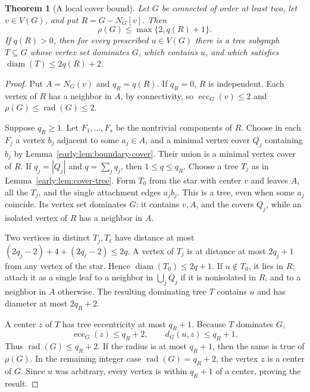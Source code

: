\documentclass[11pt,a4paper]{article}
\newtheorem{theorem}{Theorem}[section]
\theoremstyle{definition}\newtheorem{definition}[theorem]{Definition}
\theoremstyle{remark}\newtheorem{remark}[theorem]{Remark}
\newcommand{\rad}{\operatorname{rad}}
\newcommand{\diam}{\operatorname{diam}}
\begin{document}
\begin{theorem}[A local cover bound]
\label{early:thm:center-local}
Let $G$ be connected of order at least two, let $v\in V(G)$, and put
$R=G-N_G[v]$.  Then
\begin{equation}
 \rho(G)\leq\max\{2,q(R)+1\}.
 \label{early:eq:center-local}
\end{equation}
If $q(R)>0$, then for every prescribed $u\in V(G)$ there is a tree
subgraph $T\subseteq G$ whose vertex set dominates $G$, which contains
$u$, and which satisfies $\diam(T)\leq2q(R)+2$.
\end{theorem}
\begin{proof}
Put $A=N_G(v)$ and $q_R=q(R)$.  If $q_R=0$, $R$ is independent.  Each
vertex of $R$ has a neighbor in $A$, by connectivity, so
$\operatorname{ecc}_G(v)\leq2$ and $\rho(G)\leq\rad(G)\leq2$.

Suppose $q_R\geq1$.  Let $F_1,\ldots,F_s$ be the nontrivial components
of $R$.  Choose in each $F_j$ a vertex $b_j$ adjacent to some $a_j\in A$,
and a minimal vertex cover $Q_j$ containing $b_j$ by
Lemma~\ref{early:lem:boundary-cover}.  Their union is a minimal vertex
cover of $R$.  If $q_j=|Q_j|$ and $q=\sum_jq_j$, then $1\leq q\leq q_R$.
Choose a tree $T_j$ as in Lemma~\ref{early:lem:cover-tree}.  Form $T_0$
from the star with center $v$ and leaves $A$, all the $T_j$, and the
single attachment edges $a_jb_j$.  This is a tree, even when some $a_j$
coincide.  Its vertex set dominates $G$: it contains $v,A$, and the covers
$Q_j$, while an isolated vertex of $R$ has a neighbor in $A$.

Two vertices in distinct $T_j,T_\ell$ have distance at most
$(2q_j-2)+4+(2q_\ell-2)\leq2q$.  A vertex of $T_j$ is at distance at
most $2q_j+1$ from any vertex of the star.  Hence
$\diam(T_0)\leq2q+1$.  If $u\notin T_0$, it lies in $R$; attach it as
a single leaf to a neighbor in $\bigcup_jQ_j$ if it is nonisolated in
$R$, and to a neighbor in $A$ otherwise.  The resulting dominating tree
$T$ contains $u$ and has diameter at most $2q_R+2$.

A center $z$ of $T$ has tree eccentricity at most $q_R+1$.  Because $T$
dominates $G$,
\[
 \operatorname{ecc}_G(z)\leq q_R+2,
 \qquad d_G(u,z)\leq q_R+1.
\]
Thus $\rad(G)\leq q_R+2$.  If the radius is at most $q_R+1$, then the
same is true of $\rho(G)$.  In the remaining integer case
$\rad(G)=q_R+2$, the vertex $z$ is a center of $G$.  Since $u$ was
arbitrary, every vertex is within $q_R+1$ of a center, proving the result.
\end{proof}
\end{document}
